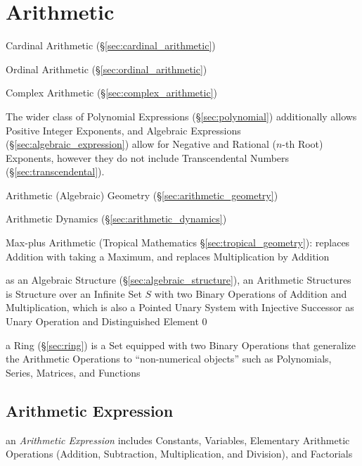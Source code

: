 \section{Arithmetic}\label{sec:arithmetic}

Cardinal Arithmetic (\S\ref{sec:cardinal_arithmetic})

Ordinal Arithmetic (\S\ref{sec:ordinal_arithmetic})

Complex Arithmetic (\S\ref{sec:complex_arithmetic})

The wider class of Polynomial Expressions (\S\ref{sec:polynomial}) additionally
allows Positive Integer Exponents, and Algebraic Expressions
(\S\ref{sec:algebraic_expression}) allow for Negative and Rational ($n$-th
Root) Exponents, however they do not include Transcendental Numbers
(\S\ref{sec:transcendental}).

\fist Arithmetic (Algebraic) Geometry (\S\ref{sec:arithmetic_geometry})

\fist Arithmetic Dynamics (\S\ref{sec:arithmetic_dynamics})

\fist Max-plus Arithmetic (Tropical Mathematics \S\ref{sec:tropical_geometry}):
replaces Addition with taking a Maximum, and replaces Multiplication by Addition

as an Algebraic Structure (\S\ref{sec:algebraic_structure}), an Arithmetic
Structures is Structure over an Infinite Set $S$ with two Binary Operations of
Addition and Multiplication, which is also a Pointed Unary System with
Injective Successor as Unary Operation and Distinguished Element $0$

a Ring (\S\ref{sec:ring}) is a Set equipped with two Binary Operations that
generalize the Arithmetic Operations to ``non-numerical objects'' such as
Polynomials, Series, Matrices, and Functions



\subsection{Arithmetic Expression}\label{sec:arithmetic_expression}

an \emph{Arithmetic Expression} includes Constants, Variables, Elementary
Arithmetic Operations (Addition, Subtraction, Multiplication, and Division), and
Factorials




